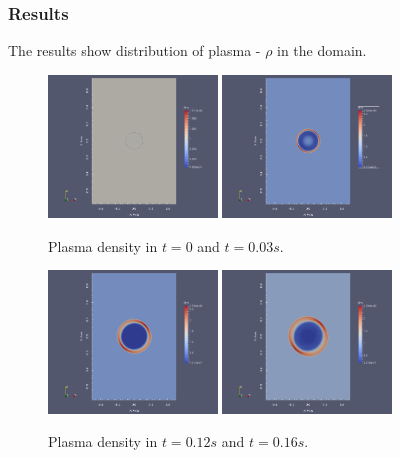 \subsubsection{Results}
The results show distribution of plasma - $\rho$ in the domain.
\begin{figure}[H]
\begin{center}
    \includegraphics[width=0.4\textwidth]{img/0-density.png}
    \includegraphics[width=0.4\textwidth]{img/5-density.png}
\end{center} 
\caption{Plasma density in $t = 0$ and $t = 0.03s$.}
\end{figure} 
\begin{figure}[H]
    \begin{center}
        \includegraphics[width=0.4\textwidth]{img/10-density.png}
        \includegraphics[width=0.4\textwidth]{img/13-density.png}
    \end{center} 
    \caption{Plasma density in $t = 0.12s$ and $t = 0.16s$.}
\end{figure} 
